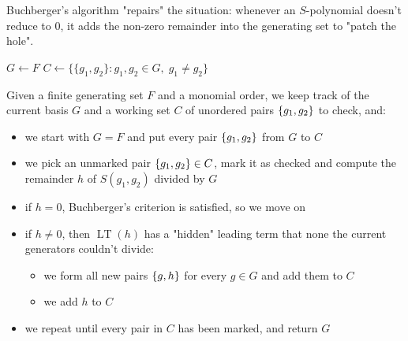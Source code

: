 \documentclass[a4paper, 11pt]{report}
\newcommand{\LT}{\operatorname{LT}}
\begin{document}
Buchberger's algorithm "repairs" the situation: whenever an $S$-polynomial doesn't reduce to $0$, it adds the non-zero remainder into the generating set to "patch the hole".

\begin{algorithm}[H]
\caption{Buchberger's Algorithm}
$G \leftarrow F$\;
$C \leftarrow \{\{g_1, g_2\} : g_1, g_2 \in G,\; g_1 \neq g_2\}$\;
\;
\end{algorithm}

Given a finite generating set $F$ and a monomial order,
we keep track of the current basis $G$ and a working set $C$ of unordered pairs $\set{g_1, g_2}$ to check, and:
\begin{itemize}
    \item we start with $G = F$ and put every pair $\set{g_1, g_2}$ from $G$ to $C$
    \item we pick an unmarked pair $\set{g_1, g_2}\in C$, mark it as checked and compute the remainder $h$ of $S(g_1, g_2)$ divided by $G$
    \item if $h = 0$, Buchberger's criterion is satisfied, so we move on
    \item if $h\neq 0$, then $\LT(h)$ has a "hidden" leading term that none the current generators couldn't divide:
    \begin{itemize}
        \item we form all new pairs $\set{g, h}$ for every $g \in G$ and add them to $C$
        \item we add $h$ to $C$
    \end{itemize}
\item we repeat until every pair in $C$ has been marked, and return $G$
\end{itemize}
\end{document}
